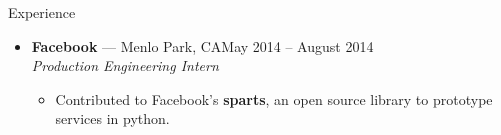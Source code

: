 \documentclass[10pt,oneside]{article}
\newenvironment{ressection}[1]{
	\vspace{2pt}
	{\fontfamily{bch}\selectfont\Large#1}
	\begin{itemize}
	\vspace{1pt}
}{
	\end{itemize}
}
\newcommand{\ressubitem}[1]{
	\vspace{-1pt}
	\item \begin{flushleft} #1 \end{flushleft}
}
\newcommand{\resbigitem}[3]{
	\vspace{-3pt}
	\item
	\textbf{#1} --- #2 \\
	\textit{#3}
}
\newenvironment{ressubsec}[3]{
	\resbigitem{#1}{#2}{#3}
	\vspace{-1pt}
	\begin{itemize}
}{
	\end{itemize}
}
\begin{document}
\begin{ressection}{Experience}
\begin{ressubsec}{Facebook}{Menlo Park, CA\hfill May 2014 -- August 2014}{Production Engineering Intern}
		\ressubitem{Contributed to Facebook's \textbf{sparts}, an open source library to prototype services in python.}
	\end{ressubsec}

\end{ressection}
\end{document}
